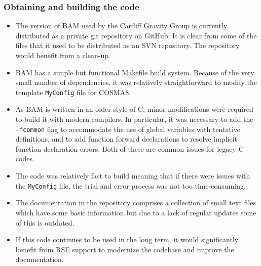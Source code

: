\documentclass[12pt,a4paper]{article}
\numberwithin{figure}{subsection}
\newcommand{\bam}{\textsc{BAM}\xspace}
\begin{document}
\subsubsection{Obtaining and building the code}
\begin{itemize}
    \item The version of \bam used by the Cardiff Gravity Group is currently
    distributed as a private git repository on GitHub. It is clear from some of
    the files that it used to be distributed as an SVN repository. The
    repository would benefit from a clean-up.
    \item \bam has a simple but functional Makefile build system. Because of the
    very small number of dependencies, it was relatively straightforward to
    modify the template \texttt{MyConfig} file for COSMA8.
    \item As \bam is written in an older style of C, minor modifications were
    required to build it with modern compilers. In particular, it was necessary
    to add the \texttt{-fcommon} flag to accommodate the use of global variables
    with tentative definitions, and to add function forward declarations to
    resolve implicit function declaration errors. Both of these are common
    issues for legacy C codes.
    \item The code was relatively fast to build meaning that if there were
    issues with the \texttt{MyConfig} file, the trial and error process was not
    too time-consuming.
    \item The documentation in the repository comprises a collection of small
    text files which have some basic information but due to a lack of regular updates 
    some of this is outdated.
    \item If this code continues to be used in the long term, it
    would significantly benefit from RSE support to modernize the codebase and
    improve the documentation.
\end{itemize}
\end{document}
